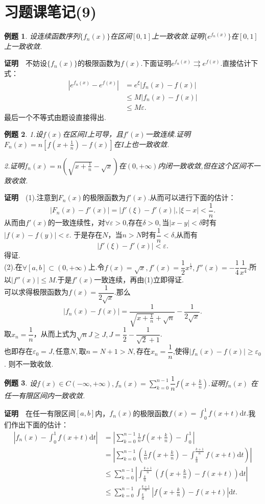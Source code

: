 \documentclass[UTF8]{article}
\newcommand{\zm}{\textbf{证明}$\quad$}
\newtheorem{exa}{\hspace{2em}例题}[section]
\begin{document}
\section{习题课笔记(9)}
\begin{exa}
  设连续函数序列$\{f_n(x)\}$在区间$[0,1]$上一致收敛.证明$\{e^{f_n(x)}\}$在$[0,1]$上一致收敛.
\end{exa}
\zm 不妨设$\{f_n(x)\}$的极限函数为$f(x)$.下面证明$e^{f_n(x)}\rightrightarrows e^{f(x)}.$直接估计下式：
\begin{align*}
  |e^{f_n(x)}-e^{f(x)}|&=e^\xi|f_n(x)-f(x)|\\
  &\le M|f_n(x)-f(x)|\\
  &\le M\varepsilon.
\end{align*}
最后一个不等式由题设直接得出.
\begin{exa}
  1.设$f(x)$在区间$I$上可导，且$f'(x)$一致连续.证明$F_n(x)=n[f(x+\frac{1}{n})-f(x)]$在$I$上也一致收敛.

  2.证明$f_n(x)=n(\sqrt{x+\frac{1}{n}}-\sqrt{x})$在$(0,+\infty)$内闭一致收敛,但在这个区间不一致收敛.
\end{exa}
\zm (1).注意到$F_n(x)$的极限函数为$f'(x).$从而可以进行下面的估计：
$$|F_n(x)-f'(x)|=|f'(\xi)-f'(x)|,|\xi-x|<\frac{1}{n}.$$
从而由$f'(x)$的一致连续性，对$\forall\varepsilon>0$,存在$\delta>0,$当$|x-y|<\delta$时有$|f(x)-f(y)|<\varepsilon.$
于是存在$N$，当$n>N$时有$\dfrac{1}{n}<\delta$,从而有
$$|f'(\xi)-f'(x)|<\varepsilon.$$得证.\\
(2).在$\forall[a,b]\subset(0,+\infty)$上.令$f(x)=\sqrt{x},f'(x)=\dfrac{1}{2}x^{\frac{1}{2}},f''(x)=
-\dfrac{1}{4}\dfrac{1}{x^4}$.所以$|f''(x)|\le M.$于是$f'(x)$一致连续，再由(1)立即得证.\\
可以求得极限函数为$f(x)=\dfrac{1}{2\sqrt{x}}.$那么
$$|f_n(x)-f(x)|=\dfrac{1}{\sqrt{x+\frac{1}{n}}+\sqrt{n}}-\dfrac{1}{2\sqrt{x}}.$$
取$x_n=\dfrac{1}{n}$，从而上式为$\sqrt{n}J\ge J,J=\dfrac{1}{2}-\dfrac{1}{\sqrt{2}+1}$.\\
也即存在$\varepsilon_0=J,$任意$N,$取$n=N+1>N,$存在$x_n=\dfrac{1}{n}$,使得$|f_n(x)-f(x)|\ge\varepsilon_0$.
则不一致收敛.
\begin{exa}
  设$f(x)\in C(-\infty,+\infty),f_n(x)=\sum\limits_{k=0}^{n-1}\dfrac{1}{n}f(x+\frac{k}{n}).$证明$f_n(x)$
  在任一有限区间内一致收敛.
\end{exa}
\zm 在任一有限区间$[a,b]$内，$f_n(x)$的极限函数$f(x)=\int_0^1f(x+t)\mathrm{d}t.$我们作出下面的估计：
\begin{align*}
  \left|f_n(x)-\int_0^1f(x+t)\mathrm{d}t\right|&=
  \left|\sum_{k=0}^{n-1}\frac{1}{n}f(x+\frac{k}{n})-\int_0^1\right|\\
  &=\left|\sum_{k=0}^{n-1}\left(\frac{1}{n}f(x+\frac{k}{n})-\int_{\frac{k}{n}}^{\frac{k+1}{n}}
  f(x+t)\mathrm{d}t\right)\right|\\
  &\le\sum_{k=0}^{n-1}\left|\int_{\frac{k}{n}}^{\frac{k+1}{n}}(f(x+\frac{k}{n})-f(x+t))\mathrm{d}t\right|\\
  &\le\sum_{k=0}^{n-1}\int_{\frac{k}{n}}^{\frac{k+1}{n}}\left|f(x+\frac{k}{n})-f(x+t)\right|\mathrm{d}t.
\end{align*}
\end{document}
